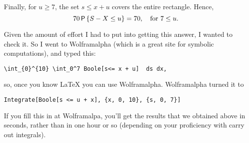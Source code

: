 \begin{exercise}
\begin{solution}
Finally, for $u\geq 7$, the set $s\leq x+u$ covers the entire rectangle. Hence, 
\begin{equation*}
70\, \P{S-X \leq u}=  70, \quad \text{for } 7\leq u.
\end{equation*}

Given the amount of effort I had to put into getting this answer, I wanted to check it. So I went to  Wolframalpha (which is a great site for symbolic computations), and typed this: 
\begin{verbatim}
\int_{0}^{10} \int_0^7 Boole[s<= x + u]  ds dx,
\end{verbatim}
so, once you know \LaTeX\/ you can use Wolframalpha.  Wolframalpha turned it to 
\begin{verbatim}
Integrate[Boole[s <= u + x], {x, 0, 10}, {s, 0, 7}]
\end{verbatim}
If you fill this in at Wolframalpa, you'll get the results that we obtained above in seconds, rather than in one hour or so (depending on your proficiency with carry out integrals).
\end{solution}
\end{exercise}



